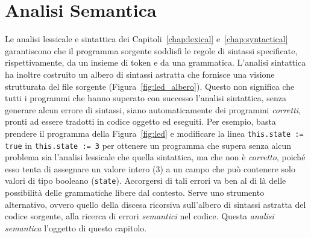 \chapter{Analisi Semantica}\label{chap:semantical}
%
\vspace*{-2ex}
\begin{center}
\end{center}
%
Le analisi lessicale e sintattica dei Capitoli~\ref{chap:lexical}
e~\ref{chap:syntactical} garantiscono che il programma sorgente
soddisfi le regole di sintassi specificate, rispettivamente,
da un insieme di token e da una grammatica. L'analisi sintattica
ha inoltre costruito un albero di sintassi astratta che fornisce una visione
strutturata del file sorgente (Figura~\ref{fig:led_albero}).
Questo non significa che tutti i programmi che hanno superato con successo
l'analisi sintattica, \cioe senza generare alcun errore di sintassi,
siano automaticamente dei programmi \emph{corretti}, pronti ad essere tradotti
in codice oggetto ed eseguiti. Per esempio, basta prendere il programma
della Figura~\ref{fig:led} e modificare la linea \texttt{this.state := true}
in \texttt{this.state := 3} per ottenere un programma che supera senza alcun
problema sia l'analisi lessicale che quella sintattica, ma che non \`e
\emph{corretto}, poich\'e esso tenta di assegnare un valore intero
($3$) a un campo che pu\`o contenere solo valori di tipo
booleano (\texttt{state}). Accorgersi di tali errori va ben al di l\`a delle
possibilit\`a delle grammatiche libere dal contesto. Serve uno strumento
alternativo, ovvero quello della discesa ricorsiva sull'albero di sintassi
astratta del codice sorgente, alla ricerca di errori \emph{semantici}
nel codice. Questa \emph{analisi semantica} \e l'oggetto di questo capitolo.

